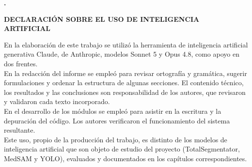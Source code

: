 \documentclass[12pt,oneside]{report}
\begin{document}










\cleardoublepage
{}
{\noindent\bfseries\thechapter. \MakeUppercase{\bibname}\par}
\vspace{1em}



\appendix %
\cleardoublepage


\cleardoublepage
{}
{\noindent\bfseries \MakeUppercase{Declaración sobre el uso de inteligencia artificial}\par}
\vspace{1em}

En la elaboración de este trabajo se utilizó la herramienta de inteligencia artificial generativa Claude, de Anthropic, modelos Sonnet 5 y Opus 4.8, como apoyo en dos frentes.\\

En la redacción del informe se empleó para revisar ortografía y gramática, sugerir formulaciones y ordenar la estructura de algunas secciones. El contenido técnico, los resultados y las conclusiones son responsabilidad de los autores, que revisaron y validaron cada texto incorporado.\\

En el desarrollo de los módulos se empleó para asistir en la escritura y la depuración del código. Los autores verificaron el funcionamiento del sistema resultante.\\

Este uso, propio de la producción del trabajo, es distinto de los modelos de inteligencia artificial que son objeto de estudio del proyecto (TotalSegmentator, MedSAM y YOLO), evaluados y documentados en los capítulos correspondientes.
\end{document}
